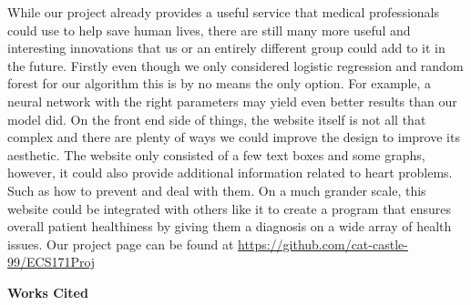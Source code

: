 \documentclass[12pt]{article}
\begin{document}
\par While our project already provides a useful service that medical professionals could use to help save human lives, there are still many more useful and interesting innovations that us or an entirely different group could add to it in the future. Firstly even though we only considered logistic regression and random forest for our algorithm this is by no means the only option. For example, a neural network with the right parameters may yield even better results than our model did. On the front end side of things, the website itself is not all that complex and there are plenty of ways we could improve the design to improve its aesthetic. The website only consisted of a few text boxes and some graphs, however, it could also provide additional information related to heart problems. Such as how to prevent and deal with them. On a much grander scale, this website could be integrated with others like it to create a program that ensures overall patient healthiness by giving them a diagnosis on a wide array of health issues.
Our project page can be found at \url{https://github.com/cat-castle-99/ECS171Proj}

\newpage
\begin{center}
    \textbf{Works Cited}
\end{center}
\end{document}
